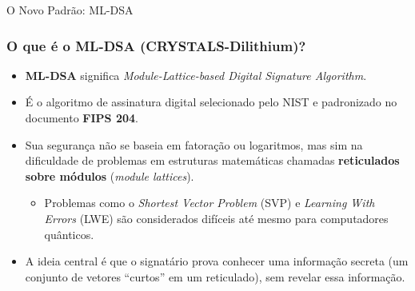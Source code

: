\documentclass{beamer}
\begin{document}
\begin{frame}{O Novo Padrão: ML-DSA}
    \frametitle{O que é o ML-DSA (CRYSTALS-Dilithium)?}
    
    \begin{itemize}
        \item \textbf{ML-DSA} significa \textit{Module-Lattice-based Digital Signature Algorithm}.
        \vspace{1em}
        \item É o algoritmo de assinatura digital selecionado pelo NIST e padronizado no documento \textbf{FIPS 204}.
        \vspace{1em}
        \item Sua segurança não se baseia em fatoração ou logaritmos, mas sim na dificuldade de problemas em estruturas matemáticas chamadas \textbf{reticulados sobre módulos} (\textit{module lattices}).
            \begin{itemize}
                \item Problemas como o \textit{Shortest Vector Problem} (SVP) e \textit{Learning With Errors} (LWE) são considerados difíceis até mesmo para computadores quânticos.
            \end{itemize}
        \vspace{1em}
        \item A ideia central é que o signatário prova conhecer uma informação secreta (um conjunto de vetores ``curtos'' em um reticulado), sem revelar essa informação.
    \end{itemize}
\end{frame}
\end{document}
